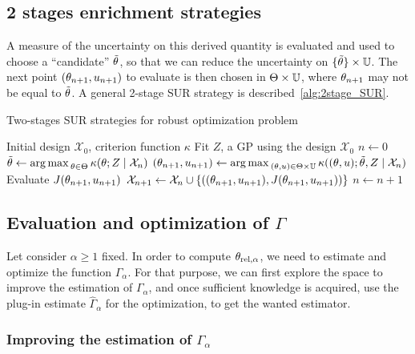 \documentclass[../../Main_ManuscritThese.tex]{subfiles}
\begin{document}
\subsection{2 stages enrichment strategies}
A measure of the uncertainty on this derived quantity is evaluated and used to choose a ``candidate'' $\tilde{\theta}$, so that we can reduce the uncertainty on $\{\tilde{\theta}\} \times \mathbb{U}$.
The next point $(\theta_{n+1}, u_{n+1})$ to evaluate is then chosen in $\Theta \times \mathbb{U}$, where $\theta_{n+1}$ may not be equal to $\tilde{\theta}$.
A general 2-stage SUR strategy is described~\cref{alg:2stage_SUR}.


\begin{algorithm}
  \caption{\label{alg:2stage_SUR} Two-stages SUR strategies for robust optimization problem}
\begin{algorithmic}
\REQUIRE Initial design $\mathcal{X}_0$, criterion function $\kappa$
\STATE Fit $Z$, a GP using the design $\mathcal{X}_0$
\STATE $n \leftarrow 0$
\STATE $\tilde{\theta} \leftarrow \operatorname*{arg\,max \,}_{\theta \in \Theta} \kappa(\theta; Z \mid \mathcal{X}_{n})$
\STATE $(\theta_{n+1},u_{n+1}) \leftarrow \operatorname*{arg\,max \,}_{(\theta,u) \in \Theta\times\mathbb{U}} \kappa((\theta,u); \tilde{\theta}, Z \mid \mathcal{X}_{n})$
\STATE Evaluate $J(\theta_{n+1}, u_{n+1})$
\STATE $\mathcal{X}_{n+1} \leftarrow \mathcal{X}_n \cup \left\{\left((\theta_{n+1},u_{n+1}), J(\theta_{n+1}, u_{n+1})\right)\right\}$
\STATE $n \leftarrow n + 1$
\ENDWHILE
\end{algorithmic}
\end{algorithm}


\subsection{Evaluation and optimization of $\Gamma$}
Let consider $\alpha\geq 1$ fixed. In order to compute ${\theta}_{\mathrm{rel, \alpha}}$, we need to estimate and optimize the function $\Gamma_{\alpha}$. For that purpose, we can first explore the space to improve the estimation of $\Gamma_{\alpha}$, and once sufficient knowledge is acquired, use the plug-in estimate $\hat{\Gamma}_{\alpha}$ for the optimization, to get the wanted estimator.
\subsubsection{Improving the estimation of $\Gamma_{\alpha}$}
\end{document}
